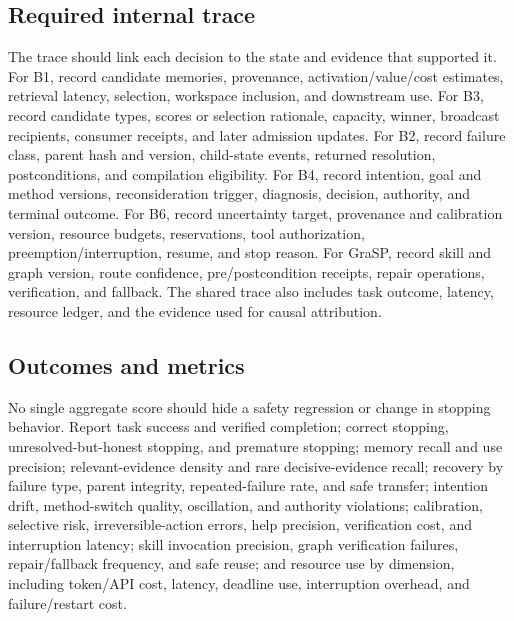 
\subsection{Required internal trace}
\label{subsec:ch18-required-trace}

The trace should link each decision to the state and evidence that supported it. For B1, record candidate memories, provenance, activation/value/cost estimates, retrieval latency, selection, workspace inclusion, and downstream use. For B3, record candidate types, scores or selection rationale, capacity, winner, broadcast recipients, consumer receipts, and later admission updates. For B2, record failure class, parent hash and version, child-state events, returned resolution, postconditions, and compilation eligibility. For B4, record intention, goal and method versions, reconsideration trigger, diagnosis, decision, authority, and terminal outcome. For B6, record uncertainty target, provenance and calibration version, resource budgets, reservations, tool authorization, preemption/interruption, resume, and stop reason. For GraSP, record skill and graph version, route confidence, pre/postcondition receipts, repair operations, verification, and fallback. The shared trace also includes task outcome, latency, resource ledger, and the evidence used for causal attribution.

\subsection{Outcomes and metrics}
\label{subsec:ch18-outcomes-metrics}

No single aggregate score should hide a safety regression or change in stopping behavior. Report task success and verified completion; correct stopping, unresolved-but-honest stopping, and premature stopping; memory recall and use precision; relevant-evidence density and rare decisive-evidence recall; recovery by failure type, parent integrity, repeated-failure rate, and safe transfer; intention drift, method-switch quality, oscillation, and authority violations; calibration, selective risk, irreversible-action errors, help precision, verification cost, and interruption latency; skill invocation precision, graph verification failures, repair/fallback frequency, and safe reuse; and resource use by dimension, including token/API cost, latency, deadline use, interruption overhead, and failure/restart cost.

